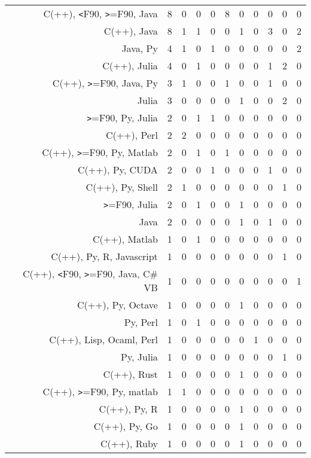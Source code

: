 {\begin{landscape}
\begin{longtable}[htb]{r|c|c|c|c|c|c|c|c|c|c}
{C(++), \verb!<!F90, \verb!>!=F90, Java} & 8 & 0 & 0 & 0 & 8 & 0 & 0 & 0 & 0 & 0 \\%
{C(++), Java} & 8 & 1 & 1 & 0 & 0 & 1 & 0 & 3 & 0 & 2 \\%
{Java, Py} & 4 & 1 & 0 & 1 & 0 & 0 & 0 & 0 & 0 & 2 \\%
{C(++), Julia} & 4 & 0 & 1 & 0 & 0 & 0 & 0 & 1 & 2 & 0 \\%
{C(++), \verb!>!=F90, Java, Py} & 3 & 1 & 0 & 0 & 1 & 0 & 0 & 1 & 0 & 0 \\%
{Julia} & 3 & 0 & 0 & 0 & 0 & 1 & 0 & 0 & 2 & 0 \\%
{\verb!>!=F90, Py, Julia} & 2 & 0 & 1 & 1 & 0 & 0 & 0 & 0 & 0 & 0 \\%
{C(++), Perl} & 2 & 2 & 0 & 0 & 0 & 0 & 0 & 0 & 0 & 0 \\%
{C(++), \verb!>!=F90, Py, Matlab} & 2 & 0 & 1 & 0 & 1 & 0 & 0 & 0 & 0 & 0 \\%
{C(++), Py, CUDA} & 2 & 0 & 0 & 1 & 0 & 0 & 0 & 1 & 0 & 0 \\%
{C(++), Py, Shell} & 2 & 1 & 0 & 0 & 0 & 0 & 0 & 0 & 1 & 0 \\%
{\verb!>!=F90, Julia} & 2 & 0 & 1 & 0 & 0 & 1 & 0 & 0 & 0 & 0 \\%
{Java} & 2 & 0 & 0 & 0 & 0 & 1 & 0 & 1 & 0 & 0 \\%
{C(++), Matlab} & 1 & 0 & 1 & 0 & 0 & 0 & 0 & 0 & 0 & 0 \\%
{C(++), Py, R, Javascript} & 1 & 0 & 0 & 0 & 0 & 0 & 0 & 0 & 1 & 0 \\%
{C(++), \verb!<!F90, \verb!>!=F90, Java, C\# VB} & 1 & 0 & 0 & 0 & 0 & 0 & 0 & 0 & 0 & 1 \\%
{C(++), Py, Octave} & 1 & 0 & 0 & 0 & 0 & 1 & 0 & 0 & 0 & 0 \\%
{Py, Perl} & 1 & 0 & 1 & 0 & 0 & 0 & 0 & 0 & 0 & 0 \\%
{C(++), Lisp, Ocaml, Perl} & 1 & 0 & 0 & 0 & 0 & 0 & 1 & 0 & 0 & 0 \\%
{Py, Julia} & 1 & 0 & 0 & 0 & 0 & 0 & 0 & 0 & 1 & 0 \\%
{C(++), Rust} & 1 & 0 & 0 & 0 & 0 & 1 & 0 & 0 & 0 & 0 \\%
{C(++), \verb!>!=F90, Py, matlab} & 1 & 1 & 0 & 0 & 0 & 0 & 0 & 0 & 0 & 0 \\%
{C(++), Py, R} & 1 & 0 & 0 & 0 & 0 & 1 & 0 & 0 & 0 & 0 \\%
{C(++), Py, Go} & 1 & 0 & 0 & 0 & 0 & 1 & 0 & 0 & 0 & 0 \\%
{C(++), Ruby} & 1 & 0 & 0 & 0 & 0 & 1 & 0 & 0 & 0 & 0 \\%

\end{longtable}
\end{landscape}}
